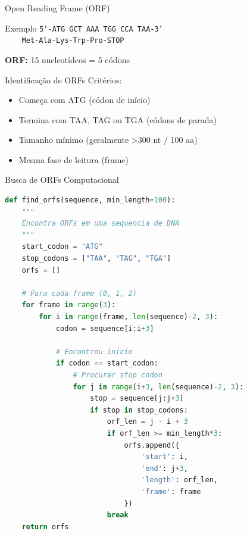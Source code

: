 \begin{frame}[shrink=15]{Open Reading Frame (ORF)}

\vspace{0.3cm}

\begin{exampleblock}{Exemplo}
\texttt{5'-ATG GCT AAA TGG CCA TAA-3'}\\
\texttt{~~~~Met-Ala-Lys-Trp-Pro-STOP}

\vspace{0.2cm}

\textbf{ORF:} 15 nucleotídeos = 5 códons
\end{exampleblock}

\vspace{0.3cm}

\begin{block}{Identificação de ORFs}
Critérios:
\begin{itemize}
    \item Começa com ATG (códon de início)
    \item Termina com TAA, TAG ou TGA (códons de parada)
    \item Tamanho mínimo (geralmente \textgreater 300 nt / 100 aa)
    \item Mesma fase de leitura (frame)
\end{itemize}
\end{block}
\end{frame}

\begin{frame}[fragile, shrink=10]{Busca de ORFs Computacional}
\begin{lstlisting}[language=Python, caption=Identificação de ORFs, basicstyle=\ttfamily\tiny]
def find_orfs(sequence, min_length=100):
    """
    Encontra ORFs em uma sequencia de DNA
    """
    start_codon = "ATG"
    stop_codons = ["TAA", "TAG", "TGA"]
    orfs = []

    # Para cada frame (0, 1, 2)
    for frame in range(3):
        for i in range(frame, len(sequence)-2, 3):
            codon = sequence[i:i+3]

            # Encontrou inicio
            if codon == start_codon:
                # Procurar stop codon
                for j in range(i+3, len(sequence)-2, 3):
                    stop = sequence[j:j+3]
                    if stop in stop_codons:
                        orf_len = j - i + 3
                        if orf_len >= min_length*3:
                            orfs.append({
                                'start': i,
                                'end': j+3,
                                'length': orf_len,
                                'frame': frame
                            })
                        break
    return orfs
\end{lstlisting}
\end{frame}


